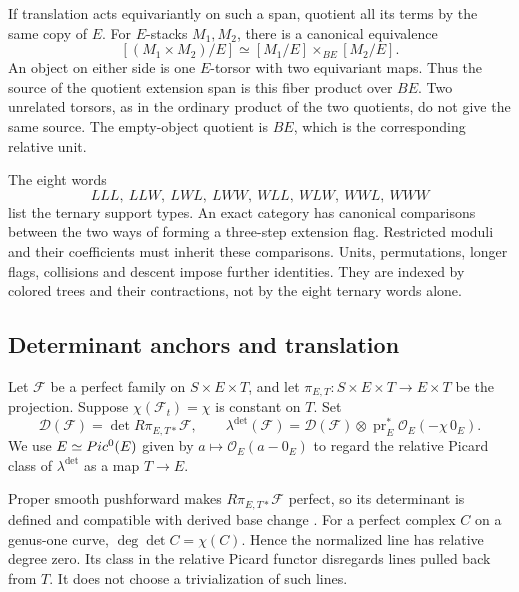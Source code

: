 If translation acts equivariantly on such a span, quotient all its
terms by the same copy of $E$.  For $E$-stacks $M_1,M_2$, there is
a canonical equivalence
\[
[(M_1\times M_2)/E]
\simeq[M_1/E]\mathbin{\times}_{BE}[M_2/E].
\]
An object on either side is one $E$-torsor with two equivariant maps.
Thus the source of the quotient extension span is this fiber product
over $BE$.  Two unrelated torsors, as in the ordinary product of the
two quotients, do not give the same source.  The empty-object quotient
is $BE$, which is the corresponding relative unit.

\begin{remark}
\label{rem:eight-words-vs-colored-trees}
The eight words
\[
LLL,\ LLW,\ LWL,\ LWW,\ WLL,\ WLW,\ WWL,\ WWW
\]
list the ternary support types.
An exact category has canonical comparisons between the two ways of
forming a three-step extension flag.  Restricted moduli and their
coefficients must inherit these comparisons.  Units, permutations,
longer flags, collisions and descent impose further identities.
They are indexed by colored trees and their contractions, not by
the eight ternary words alone.
\end{remark}

\subsection{Determinant anchors and translation}
\label{subsec:e-quotient-anchor}

\begin{definition}
\label{def:determinant-anchor}
Let $\mathcal F$ be a perfect family on $S\times E\times T$, and
let $\pi_{E,T}:S\times E\times T\to E\times T$ be the projection.
Suppose $\chi(\mathcal F_t)=\chi$ is constant on $T$.  Set
\[
\mathscr D(\mathcal F)=\det R\pi_{E,T*}\mathcal F,
\qquad
\lambda^{\det}(\mathcal F)
=\mathscr D(\mathcal F)\otimes
\operatorname{pr}_E^*\mathcal O_E(-\chi\,0_E).
\]
We use $E\simeq Pic^0(E)$ given by
$a\mapsto\mathcal O_E(a-0_E)$ to regard the relative Picard class
of $\lambda^{\det}$ as a map $T\to E$.
\end{definition}

Proper smooth pushforward makes $R\pi_{E,T*}\mathcal F$ perfect,
so its determinant is defined and compatible with derived base change
\cite{KnudsenMumfordDet,DeligneDetCohomology}.
For a perfect complex $C$ on a genus-one curve,
$\deg\det C=\chi(C)$.  Hence the normalized line has relative degree
zero.  Its class in the relative Picard functor disregards lines
pulled back from $T$.  It does not choose a trivialization of such lines.

